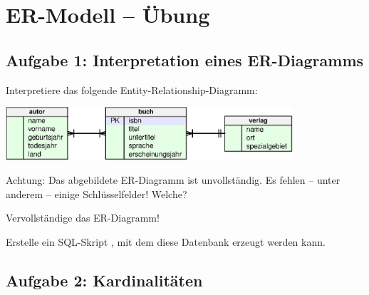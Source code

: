 \clearpage

\rehead[]{\textcolor{lightblue}{AvHG, Inf, My}}
\lohead[]{\textcolor{lightblue}{AvHG, Inf, My}}

\section{ER-Modell -- Übung}

\subsection{Aufgabe 1: Interpretation eines ER-Diagramms}

\begin{compactenum}[a)]
\item Interpretiere das folgende Entity-Relationship-Diagramm:

\vspace{2mm}
\includegraphics[width=0.80\textwidth]{./inf/SEKII/34_SQL_ER-Diagramme/ermAufgabe1.eps}
\vspace{2mm}

Achtung: Das abgebildete ER-Diagramm ist unvollständig. Es fehlen -- unter
anderem -- einige Schlüsselfelder! Welche?

Vervollständige das ER-Diagramm!

\vspace{1mm}

\item Erstelle ein SQL-Skript , mit dem diese
Datenbank erzeugt werden kann.
\end{compactenum}


\subsection{Aufgabe 2: Kardinalitäten}


